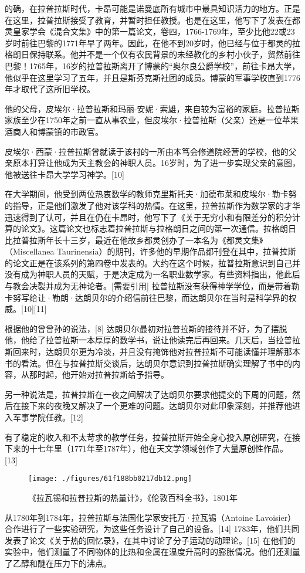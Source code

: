 的确，在拉普拉斯时代，卡昂可能是诺曼底所有城市中最具知识活力的地方。正是在这里，拉普拉斯接受了教育，并暂时担任教授。也是在这里，他写下了发表在都灵皇家学会《混合文集》中的第一篇论文，卷四，1766-1769年，至少比他22或23岁时前往巴黎的1771年早了两年。因此，在他不到20岁时，他已经与位于都灵的拉格朗日保持联系。他并不是一个仅有农民背景的未经教化的乡村小伙子，贸然前往巴黎！1765年，16岁的拉普拉斯离开了博蒙的“奥尔良公爵学校”，前往卡昂大学，他似乎在这里学习了五年，并且是斯芬克斯社团的成员。博蒙的军事学校直到1776年才取代了这所旧学校。

他的父母，皮埃尔·拉普拉斯和玛丽-安妮·索雄，来自较为富裕的家庭。拉普拉斯家族至少在1750年之前一直从事农业，但皮埃尔·拉普拉斯（父亲）还是一位苹果酒商人和博蒙镇的市政官。

皮埃尔·西蒙·拉普拉斯曾就读于该村的一所由本笃会修道院经营的学校，他的父亲原本打算让他成为天主教会的神职人员。16岁时，为了进一步实现父亲的意图，他被送往卡昂大学学习神学。[10]

在大学期间，他受到两位热衷数学的教师克里斯托夫·加德布莱和皮埃尔·勒卡努的指导，正是他们激发了他对该学科的热情。在这里，拉普拉斯作为数学家的才华迅速得到了认可，并且在仍在卡昂时，他写下了《关于无穷小和有限差分的积分计算的论文》。这篇论文也标志着拉普拉斯与拉格朗日之间的第一次通信。拉格朗日比拉普拉斯年长十三岁，最近在他故乡都灵创办了一本名为《都灵文集》（Miscellanea Taurinensia）的期刊，许多他的早期作品都刊登在其中，拉普拉斯的论文正是在该系列的第四卷中发表的。大约在这个时候，拉普拉斯意识到自己并没有成为神职人员的天赋，于是决定成为一名职业数学家。有些资料指出，他此后与教会决裂并成为无神论者。[需要引用] 拉普拉斯没有获得神学学位，而是带着勒卡努写给让·勒朗·达朗贝尔的介绍信前往巴黎，而达朗贝尔在当时是科学界的权威。[10][11]

根据他的曾曾孙的说法，[8] 达朗贝尔最初对拉普拉斯的接待并不好，为了摆脱他，他给了拉普拉斯一本厚厚的数学书，说让他读完后再回来。几天后，当拉普拉斯回来时，达朗贝尔更为冷淡，并且没有掩饰他对拉普拉斯不可能读懂并理解那本书的看法。但在与拉普拉斯交谈后，达朗贝尔意识到拉普拉斯确实理解了书中的内容，从那时起，他开始对拉普拉斯给予指导。

另一种说法是，拉普拉斯在一夜之间解决了达朗贝尔要求他提交的下周的问题，然后在接下来的夜晚又解决了一个更难的问题。达朗贝尔对此印象深刻，并推荐他进入军事学院任教。[12]

有了稳定的收入和不太苛求的教学任务，拉普拉斯开始全身心投入原创研究，在接下来的十七年里（1771年至1787年），他在天文学领域创作了大量原创性作品。[13]
\begin{figure}[ht]
\centering
\texttt{[image: ./figures/61f188bb0217db12.png]}
\caption{《拉瓦锡和拉普拉斯的热量计》，《伦敦百科全书》，1801年} \label{fig_LPLS_6}
\end{figure}
从1780年到1784年，拉普拉斯与法国化学家安托万·拉瓦锡（Antoine Lavoisier）合作进行了一些实验研究，为这些任务设计了自己的设备。[14] 1783年，他们共同发表了论文《关于热的回忆录》，在其中讨论了分子运动的动理论。[15] 在他们的实验中，他们测量了不同物体的比热和金属在温度升高时的膨胀情况。他们还测量了乙醇和醚在压力下的沸点。

